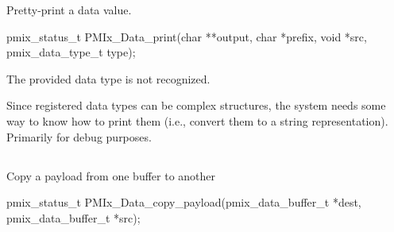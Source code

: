 Pretty-print a data value.

\format

\cspecificstart
\begin{codepar}
pmix_status_t
PMIx_Data_print(char **output, char *prefix,
                void *src, pmix_data_type_t type);
\end{codepar}
\cspecificend

\begin{arglist}
\end{arglist}

\returnstart
\begin{constantdesc}
\item {} The provided data type is not recognized.
\end{constantdesc}
\returnend

\descr

Since registered data types can be complex structures, the system needs some way to know how to print them (i.e., convert them to a string representation). Primarily for debug purposes.


\subsection{}

\summary

Copy a payload from one buffer to another

\format

\cspecificstart
\begin{codepar}
pmix_status_t
PMIx_Data_copy_payload(pmix_data_buffer_t *dest,
                       pmix_data_buffer_t *src);
\end{codepar}
\cspecificend

\begin{arglist}
\end{arglist}

